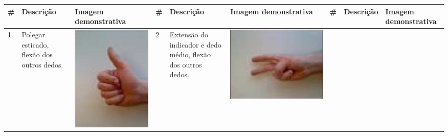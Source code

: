 \begin{table}[htb]
	\begin{tabular}{m{0.5cm} m{1.5cm} m{2cm} | m{0.5cm} m{1.5cm} m{2cm} | m{0.5cm} m{1.5cm} m{2cm}}
		\toprule
		\# & Descrição & Imagem \newline demonstrativa	& \# & Descrição & Imagem \newline demonstrativa & \# & Descrição & Imagem \newline demonstrativa\\
		\midrule \midrule					
		1	&	Polegar esticado, flexão dos outros dedos.	& \includegraphics[width=\linewidth]{./img/moves/mov1.png} &
		2	&	Extensão do indicador e dedo médio, flexão dos outros dedos.	& \includegraphics[width=\linewidth]{./img/moves/mov2.png} &

\end{tabular}
\end{table}
